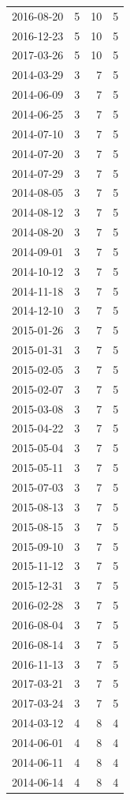 \begin{tabular}{lrrr}
2016-08-20 & 5 & 10 & 5 \\
2016-12-23 & 5 & 10 & 5 \\
2017-03-26 & 5 & 10 & 5 \\
2014-03-29 & 3 & 7 & 5 \\
2014-06-09 & 3 & 7 & 5 \\
2014-06-25 & 3 & 7 & 5 \\
2014-07-10 & 3 & 7 & 5 \\
2014-07-20 & 3 & 7 & 5 \\
2014-07-29 & 3 & 7 & 5 \\
2014-08-05 & 3 & 7 & 5 \\
2014-08-12 & 3 & 7 & 5 \\
2014-08-20 & 3 & 7 & 5 \\
2014-09-01 & 3 & 7 & 5 \\
2014-10-12 & 3 & 7 & 5 \\
2014-11-18 & 3 & 7 & 5 \\
2014-12-10 & 3 & 7 & 5 \\
2015-01-26 & 3 & 7 & 5 \\
2015-01-31 & 3 & 7 & 5 \\
2015-02-05 & 3 & 7 & 5 \\
2015-02-07 & 3 & 7 & 5 \\
2015-03-08 & 3 & 7 & 5 \\
2015-04-22 & 3 & 7 & 5 \\
2015-05-04 & 3 & 7 & 5 \\
2015-05-11 & 3 & 7 & 5 \\
2015-07-03 & 3 & 7 & 5 \\
2015-08-13 & 3 & 7 & 5 \\
2015-08-15 & 3 & 7 & 5 \\
2015-09-10 & 3 & 7 & 5 \\
2015-11-12 & 3 & 7 & 5 \\
2015-12-31 & 3 & 7 & 5 \\
2016-02-28 & 3 & 7 & 5 \\
2016-08-04 & 3 & 7 & 5 \\
2016-08-14 & 3 & 7 & 5 \\
2016-11-13 & 3 & 7 & 5 \\
2017-03-21 & 3 & 7 & 5 \\
2017-03-24 & 3 & 7 & 5 \\
2014-03-12 & 4 & 8 & 4 \\
2014-06-01 & 4 & 8 & 4 \\
2014-06-11 & 4 & 8 & 4 \\
2014-06-14 & 4 & 8 & 4 \\

\end{tabular}
